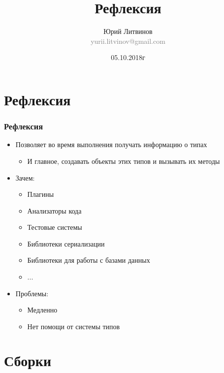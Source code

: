 \documentclass[xetex,mathserif,serif]{beamer}
\title{Рефлексия}
\author[Юрий Литвинов]{Юрий Литвинов\\\small{\textcolor{gray}{yurii.litvinov@gmail.com}}}
\date{05.10.2018г}
\begin{document}
	\frame{\titlepage}

	\section{Рефлексия}

	\begin{frame}
		\frametitle{Рефлексия}
		\begin{itemize}
			\item Позволяет во время выполнения получать информацию о типах
			\begin{itemize}
				\item И главное, создавать объекты этих типов и вызывать их методы
			\end{itemize}
			\item Зачем:
			\begin{itemize}
				\item Плагины
				\item Анализаторы кода
				\item Тестовые системы
				\item Библиотеки сериализации
				\item Библиотеки для работы с базами данных
				\item ...
			\end{itemize}
			\item Проблемы:
			\begin{itemize}
				\item Медленно
				\item Нет помощи от системы типов
			\end{itemize}
		\end{itemize}
	\end{frame}

	\section{Сборки}
\end{document}
